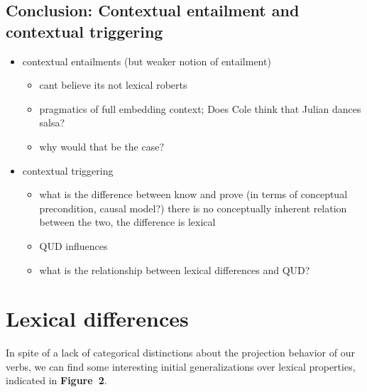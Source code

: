 \documentclass[a4paper,12pt,twoside]{article}
\begin{document}
	\subsection{Conclusion: Contextual entailment and contextual triggering}
		\begin{itemize}
			\item contextual entailments (but weaker notion of entailment)

			\begin{itemize}

				\item cant believe its not lexical roberts

				\item pragmatics of full embedding context; Does Cole think that Julian dances salsa? 

				\item why would that be the case?

			\end{itemize}

			\item contextual triggering

			\begin{itemize}

				\item what is the difference between know and prove (in terms of conceptual precondition, causal model?) there is no conceptually inherent relation between the two, the difference is lexical

				\item QUD influences

				\item what is the relationship between lexical differences and QUD?

			\end{itemize}

		\end{itemize}




\section{Lexical differences}

	In spite of a lack of categorical distinctions about the projection behavior of our verbs, we can find some interesting initial generalizations over lexical properties, indicated in \textbf{Figure\ 2}.
\end{document}
